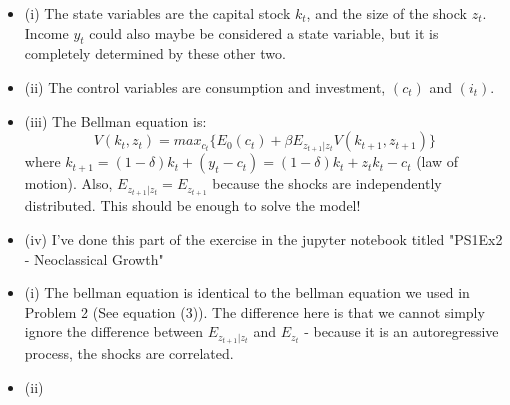 \documentclass[12pt]{article}
\newenvironment{problem}[2][Problem]{\begin{trivlist}
\item[\hskip \labelsep {\bfseries #1}\hskip \labelsep {\bfseries #2.}]}{\end{trivlist}}
\theoremstyle{definition}
\theoremstyle{definition}
\theoremstyle{definition}
\theoremstyle{definition}
\begin{document}
\begin{problem}{2}
\begin{itemize}
\item (i) The state variables are the capital stock $k_t$, and the size of the shock $z_t$. Income $y_t$ could also maybe be considered a state variable, but it is completely determined by these other two.
\item (ii) The control variables are consumption and investment, $(c_t)$ and $(i_t)$.
\item (iii) The Bellman equation is: 
\begin{equation}
V(k_t, z_t) = max_{c_t}  \big\{ E_0(c_t) + \beta E_{z_{t+1}|z_t}V(k_{t+1},z_{t+1}) \big\}
\end{equation}
where $k_{t+1} = (1 - \delta)k_t + (y_t - c_t) =(1-\delta)k_t + z_tk_t - c_t$ (law of motion). Also, $ E_{z_{t+1}|z_t} = E_{z_{t+1}}$  because the shocks are independently distributed. This should be enough to solve the model!
\item (iv) I've done this part of the exercise in the jupyter notebook titled "PS1Ex2 - Neoclassical Growth"
\end{itemize}
\end{problem}
\begin{problem}{3}
\begin{itemize}
\item (i) The bellman equation is identical to the bellman equation we used in Problem 2 (See equation (3)). The difference here is that we cannot simply ignore the difference between $E_{z_{t+1}|z_t}$ and $E_{z_t}$ - because it is an autoregressive process, the shocks are correlated.
\item (ii)
\end{itemize}
\end{problem}
\end{document}
